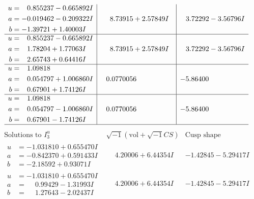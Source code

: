 \documentclass[1p]{elsarticle_modified}
\theoremstyle{definition}
\newcommand{\I}{\sqrt{-1}}
\begin{document}
$$\begin{array}{c|c|c}
\begin{aligned}
u &= \phantom{-}0.855237 - 0.665892 I \\
a &= -0.019462 - 0.209322 I \\
b &= -1.39721 + 1.40003 I\end{aligned}
 & \phantom{-}8.73915 + 2.57849 I & \phantom{-}3.72292 - 3.56796 I \\ \hline\begin{aligned}
u &= \phantom{-}0.855237 - 0.665892 I \\
a &= \phantom{-}1.78204 + 1.77063 I \\
b &= \phantom{-}2.65743 + 0.64416 I\end{aligned}
 & \phantom{-}8.73915 + 2.57849 I & \phantom{-}3.72292 - 3.56796 I \\ \hline\begin{aligned}
u &= \phantom{-}1.09818\phantom{ +0.000000I} \\
a &= \phantom{-}0.054797 + 1.006860 I \\
b &= \phantom{-}0.67901 + 1.74126 I\end{aligned}
 & \phantom{-}0.0770056\phantom{ +0.000000I} & -5.86400\phantom{ +0.000000I} \\ \hline\begin{aligned}
u &= \phantom{-}1.09818\phantom{ +0.000000I} \\
a &= \phantom{-}0.054797 - 1.006860 I \\
b &= \phantom{-}0.67901 - 1.74126 I\end{aligned}
 & \phantom{-}0.0770056\phantom{ +0.000000I} & -5.86400\phantom{ +0.000000I}\\
 \hline 
 \end{array}$$\newpage$$\begin{array}{c|c|c}  
\text{Solutions to }I^u_{3}& \I (\text{vol} + \sqrt{-1}CS) & \text{Cusp shape}\\
 \hline 
\begin{aligned}
u &= -1.031810 + 0.655470 I \\
a &= -0.842370 + 0.591433 I \\
b &= -2.18592 + 0.93071 I\end{aligned}
 & \phantom{-}4.20006 + 6.44354 I & -1.42845 - 5.29417 I \\ \hline\begin{aligned}
u &= -1.031810 + 0.655470 I \\
a &= \phantom{-}0.99429 - 1.31993 I \\
b &= \phantom{-}1.27643 - 2.02437 I\end{aligned}
 & \phantom{-}4.20006 + 6.44354 I & -1.42845 - 5.29417 I \\ \hline\begin{aligned}

\end{aligned}
\end{array}$$
\end{document}
